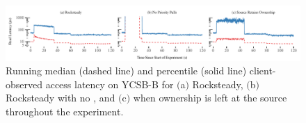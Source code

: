 \begin{figure}[t]
\centering
\includegraphics[width=1.0\textwidth]{graphs/rocksteady-latency.pdf}
  \caption{Running median (dashed line) and \nnnth percentile (solid line)
  client-observed access latency on YCSB-B for $($a$)$ Rocksteady,
  $($b$)$ Rocksteady with no \priopulls, and $($c$)$ when ownership is
  left at the source throughout the experiment.}
\label{fig:running-latency}
\end{figure}
